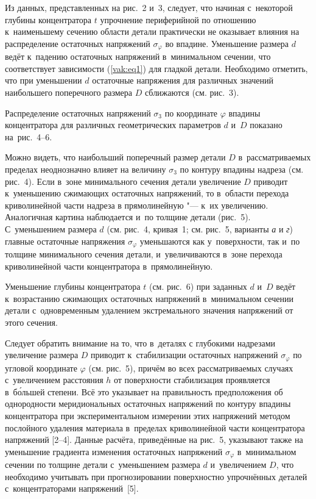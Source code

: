 Из данных, представленных на рис.~2 и~3, следует, что начиная с~некоторой глубины концентратора $t$ упрочнение периферийной по отношению к~наименьшему сечению области детали практически не оказывает влияния на распределение остаточных напряжений $\sigma _\varphi$ во впадине. 
Уменьшение размера $d$ ведёт к~падению остаточных напряжений в~минимальном сечении, что соответствует зависимости (\ref{vak:eq1}) для гладкой детали. Необходимо отметить, что при уменьшении $d$ остаточные напряжения для различных значений наибольшего поперечного размера $D$ сближаются (см. рис.~3).

Распределение остаточных напряжений $\sigma _3 $ по координате $\varphi $ впадины концентратора для различных геометрических параметров $d$ и~$D$ 
показано на~рис.~4--6. 





Можно видеть, что наибольший поперечный размер детали $D$ в~рассматриваемых пределах неоднозначно влияет на величину $\sigma _3 $ по контуру впадины 
надреза (см. рис.~4). 
Если в~зоне минимального сечения детали увеличение $D$ приводит к~уменьшению сжимающих остаточных напряжений, то в~области перехода криволинейной части надреза в прямолинейную "--- к~их увеличению. 
Аналогичная картина наблюдается и~по толщине детали (рис.~5). 
С~уменьшением размера $d$ (см. рис.~4, кривая~1; см. рис.~5, варианты {\sl а} и {\sl  г}) главные остаточные напряжения $\sigma _\varphi $ уменьшаются как у~поверхности, так и~по толщине минимального сечения детали, и~увеличиваются в~зоне перехода криволинейной части концентратора в~прямолинейную. 

\pagebreak



Уменьшение глубины концентратора $t$ (см. рис.~6) при заданных $d$ и~$D$ ведёт к~возрастанию сжимающих остаточных напряжений в~минимальном сечении детали с~одновременным удалением экстремального значения напряжений от этого сечения. 

Следует обратить внимание на то, что в~деталях с глубокими надрезами увеличение размера $D$ приводит к~стабилизации остаточных напряжений $\sigma_\varphi $ по угловой  координате $\varphi $ (см. рис.~5), причём во всех рассматриваемых случаях с~увеличением 
расстояния $h$ от поверхности стабилизация проявляется в~б\'ольшей степени. 
Всё это указывает на правильность предположения об однородности меридиональных остаточных напряжений по контуру впадины концентратора при экспериментальном измерении этих напряжений методом послойного удаления материала в~пределах криволинейной части концентратора напряжений [2--4]. 
Данные расчёта, приведённые на рис.~5, указывают также на уменьшение градиента изменения остаточных напряжений $\sigma _\varphi $ в~минимальном сечении по толщине детали с~уменьшением размера $d$ и~увеличением $D$, что необходимо учитывать при прогнозировании поверхностно упрочнённых деталей с~концентраторами напряжений~[5].

